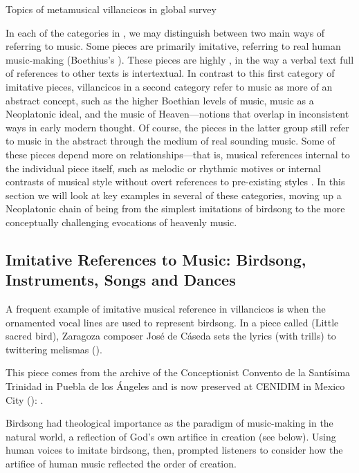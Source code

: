 
\begin{table}
    \caption{Topics of metamusical villancicos in global survey}
    \label{tab:survey}
\end{table}

In each of the categories in , we may distinguish between two
main ways of referring to music.  
Some pieces are primarily imitative, referring to real human music-making
(Boethius's ).
These pieces are highly , in the way a verbal text full of
references to other texts is intertextual.
In contrast to this first category of imitative pieces, villancicos in a second
category refer to music as more of an abstract concept, such as the higher
Boethian levels of music, music as a Neoplatonic ideal, and the music of
Heaven---notions that overlap in inconsistent ways in early modern thought.
Of course, the pieces in the latter group still refer to music in the abstract
through the medium of real sounding music.  
Some of these pieces depend more on  relationships---that
is, musical references internal to the individual piece itself, such as melodic
or rhythmic motives or internal contrasts of musical style without overt
references to pre-existing styles .
In this section we will look at key examples in several of these categories,
moving up a Neoplatonic chain of being from the simplest imitations of birdsong
to the more conceptually challenging evocations of heavenly music.


\subsection{Imitative References to Music: Birdsong, Instruments, Songs and
Dances}

A frequent example of imitative musical reference in villancicos is when the
ornamented vocal lines are used to represent birdsong.%
    \Autocite[295--301]{Illari:Polychoral}
In a piece called  (Little sacred bird), Zaragoza
composer José de Cáseda sets the lyrics  (with trills) to
twittering melismas ().%
\begin{Footnote} 
    This piece comes from the archive of the Conceptionist Convento de la
    Santísima Trinidad in Puebla de los Ángeles and is now preserved at CENIDIM
    in Mexico City (): 
    \autocite{Tello:SanchezGarzaCatalogo}.
\end{Footnote}
Birdsong had theological importance as the paradigm of music-making in the
natural world, a reflection of God's own artifice in creation (see below).
Using human voices to imitate birdsong, then, prompted listeners to consider
how the artifice of human music reflected the order of creation.

